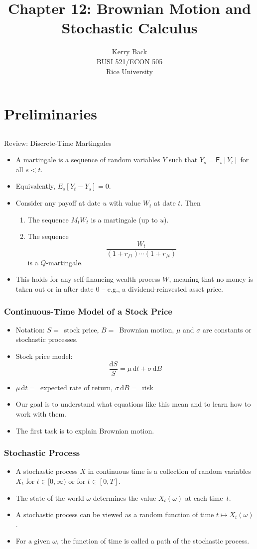 \documentclass[10pt]{beamer}
\title{Chapter 12: Brownian Motion and Stochastic Calculus}
\date{}
\author{Kerry Back\\ 
BUSI 521/ECON 505\\
Rice University}
\newcommand{\bi}{\begin{itemize}}
\newcommand{\ei}{\end{itemize}}
\newcommand{\im}{\item}
\newcommand{\D}{\mathrm{d}}
\newcommand{\mye}{\ensuremath{\mathsf{E}}}
\newcommand{\bfr}{\begin{frame}}
\begin{document}
\maketitle

\section{Preliminaries}\subsection{}

\begin{frame}{Review: Discrete-Time Martingales}
          \bi 
        \im A martingale is a sequence of random variables $Y$ such that $Y_s = \mye_s[Y_t]$ for all $s<t$.
        \im Equivalently, $E_s[Y_t-Y_s] = 0$.
        \im Consider any payoff at date $u$ with value $W_t$ at date $t$.  Then
        \begin{enumerate}
            \im The sequence $M_tW_t$ is a martingale (up to $u$).
            \im The sequence
            $$\frac{W_t}{(1+r_{f1}) \cdots (1+r_{ft})}$$
            is a $Q$-martingale.
        \end{enumerate}
        \im This holds for any self-financing wealth process $W$, meaning that no money is taken out or in after date 0 -- e.g., a dividend-reinvested asset price.
        \ei
\end{frame}

\bfr\frametitle{Continuous-Time Model of a Stock Price}
\bi
\im Notation: 
$S=\,$ stock price, $B = \,$ Brownian motion, $\mu$ and $\sigma$ are constants or stochastic processes.
\im Stock price model:
$$\frac{\D S}{S}=\mu\,\D t+\sigma\,\D B$$
\im 
$\mu\,\D t =\,$ expected rate of return, $\sigma\,\D B=\,$ risk
\im Our goal is to understand what equations like this mean and to learn how to work with them.
\im The first task is to explain Brownian motion.
\ei
\end{frame}

\bfr\frametitle{Stochastic Process}
\bi
\im A stochastic process $X$ in continuous time is a collection of random variables  $X_t$ for $t\in [0,\infty)$ or for $t\in[0,T]$.  
\im The state of the world $\omega$ determines the value $X_t(\omega)$ at each time~$t$.  
\im A stochastic process can be viewed as a random function of time $t \mapsto X_t(\omega)$.  
\im For a given $\omega$, the function of time is called a path of the stochastic process.
\ei
\end{frame}
\end{document}
